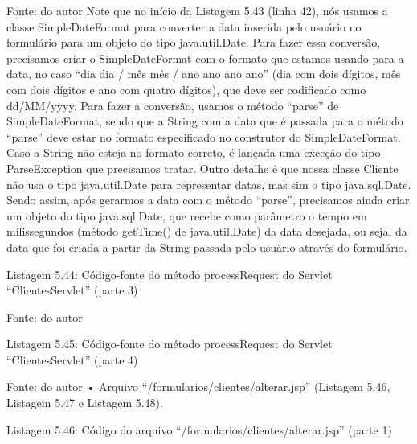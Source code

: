 Fonte: do autor
Note que no início da Listagem 5.43 (linha 42), nós usamos a classe SimpleDateFormat para converter a data inserida pelo usuário no formulário para um objeto do tipo java.util.Date. Para fazer essa conversão, precisamos criar o SimpleDateFormat com o formato que estamos usando para a data, no caso ``dia dia / mês mês / ano ano ano ano'' (dia com dois dígitos, mês com dois dígitos e ano com quatro dígitos), que deve ser codificado como dd/MM/yyyy.  Para fazer a conversão, usamos o método ``parse'' de SimpleDateFormat, sendo que a String com a data que é passada para o método ``parse'' deve estar no formato especificado no construtor do SimpleDateFormat. Caso a String não esteja no formato correto, é lançada uma exceção do tipo ParseException que precisamos tratar.
Outro detalhe é que nossa classe Cliente não usa o tipo java.util.Date para representar datas, mas sim o tipo java.sql.Date. Sendo assim, após gerarmos a data com o método ``parse'', precisamos ainda criar um objeto do tipo java.sql.Date, que recebe como parâmetro o tempo em milissegundos (método getTime() de java.util.Date) da data desejada, ou seja, da data que foi criada a partir da String passada pelo usuário através do formulário.


















Listagem 5.44: Código-fonte do método processRequest do Servlet ``ClientesServlet'' (parte 3)
 
Fonte: do autor









Listagem 5.45: Código-fonte do método processRequest do Servlet ``ClientesServlet'' (parte 4)
 
Fonte: do autor
•	Arquivo ``/formularios/clientes/alterar.jsp'' (Listagem 5.46, Listagem 5.47 e Listagem 5.48).
















Listagem 5.46: Código do arquivo ``/formularios/clientes/alterar.jsp'' (parte 1)
 
